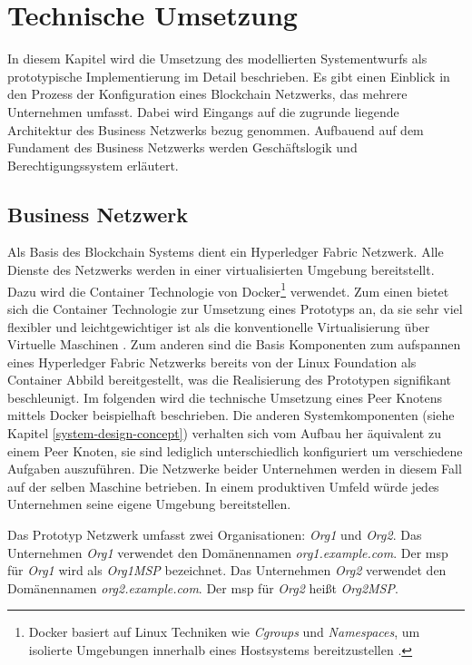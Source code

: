 \section{Technische Umsetzung} \label{sec:technical-implementation}
In diesem Kapitel wird die Umsetzung des modellierten Systementwurfs als prototypische Implementierung im Detail beschrieben. Es gibt einen Einblick in den Prozess der Konfiguration eines Blockchain Netzwerks, das mehrere Unternehmen umfasst. Dabei wird Eingangs auf die zugrunde liegende Architektur des Business Netzwerks bezug genommen. Aufbauend auf dem Fundament des Business Netzwerks werden Geschäftslogik und Berechtigungssystem erläutert.

\subsection{Business Netzwerk}
Als Basis des Blockchain Systems dient ein Hyperledger Fabric Netzwerk. Alle Dienste des Netzwerks werden in einer virtualisierten Umgebung bereitstellt. Dazu wird die Container Technologie von Docker\footnote{Docker basiert auf Linux Techniken wie \textit{Cgroups} und \textit{Namespaces}, um isolierte Umgebungen innerhalb eines Hostsystems bereitzustellen \citep{Bengel2008,Oeggl2019}.} verwendet. Zum einen bietet sich die Container Technologie zur Umsetzung eines Prototyps an, da sie sehr viel flexibler und leichtgewichtiger ist als die konventionelle Virtualisierung über Virtuelle Maschinen \citep{Ahmed2018}. Zum anderen sind die Basis Komponenten zum aufspannen eines Hyperledger Fabric Netzwerks bereits von der Linux Foundation als Container Abbild bereitgestellt, was die Realisierung des Prototypen signifikant beschleunigt. Im folgenden wird die technische Umsetzung eines Peer Knotens mittels Docker beispielhaft beschrieben. Die anderen Systemkomponenten (siehe Kapitel \ref{system-design-concept}) verhalten sich vom Aufbau her äquivalent zu einem Peer Knoten, sie sind lediglich unterschiedlich konfiguriert um verschiedene Aufgaben auszuführen. Die Netzwerke beider Unternehmen werden in diesem Fall auf der selben Maschine betrieben. In einem produktiven Umfeld würde jedes Unternehmen seine eigene Umgebung bereitstellen.

Das Prototyp Netzwerk umfasst zwei Organisationen: \textit{Org1} und \textit{Org2}. Das Unternehmen \textit{Org1} verwendet den Domänennamen \textit{org1.example.com}. Der \acf{msp} für \textit{Org1} wird als \textit{Org1MSP} bezeichnet. Das Unternehmen \textit{Org2} verwendet den Domänennamen \textit{org2.example.com}. Der \acf{msp} für \textit{Org2} heißt \textit{Org2MSP}.

